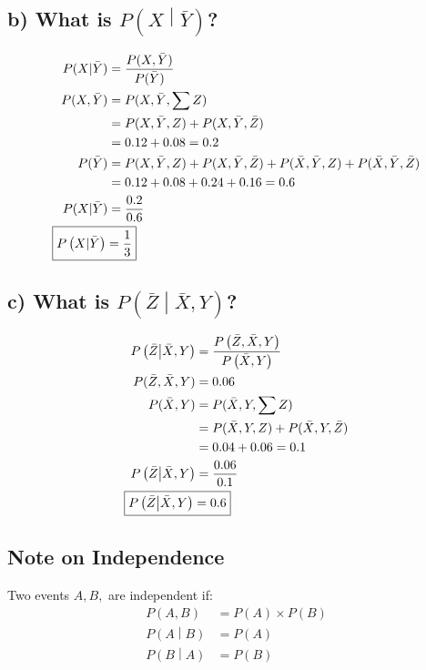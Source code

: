\documentclass[12pt,letterpaper]{article}
\begin{document}
\subsection{b) What is $P\left(X\middle|\bar{Y}\right)$?}
\begin{align*}
P(X|\bar{Y}) &= \frac{P(X,\bar{Y})}{P(\bar{Y})}\\
P(X,\bar{Y}) &= P(X,\bar{Y},\sum{Z})\\
&= P(X,\bar{Y},Z) + P(X,\bar{Y},\bar{Z})\\
&= 0.12 + 0.08 = 0.2\\
P(\bar{Y}) &= P(X,\bar{Y},Z) + P(X,\bar{Y},\bar{Z}) + P(\bar{X},\bar{Y},Z) + P(\bar{X},\bar{Y},\bar{Z})\\
&= 0.12 + 0.08 + 0.24 + 0.16 = 0.6\\
P(X|\bar{Y}) &= \frac{0.2}{0.6}\\
\Aboxed{P\left(X|\bar{Y}\right) &= \frac{1}{3}}
%
\end{align*}
\subsection{c) What is $P\left(\bar{Z}\middle|\bar{X},Y\right)$?}
\begin{align*}
P\left(\bar{Z}\middle|\bar{X},Y\right) &= \frac{P\left(\bar{Z},\bar{X},Y\right)}{P\left(\bar{X},Y\right)}\\
P(\bar{Z},\bar{X},Y) &= 0.06\\
P(\bar{X},Y) &= P(\bar{X},Y,\sum{Z})\\
&= P(\bar{X},Y,Z) + P(\bar{X},Y,\bar{Z})\\
&= 0.04 + 0.06 = 0.1\\
P\left(\bar{Z}\middle|\bar{X},Y\right) &= \frac{0.06}{0.1}\\
\Aboxed{P\left(\bar{Z}\middle|\bar{X},Y\right) &= 0.6}
%
\end{align*}
\subsection*{Note on Independence}
Two events $A,B,$ are independent if:
\begin{align}
P\left(A,B\right) &= P\left(A\right) \times P\left(B\right)\label{cond1}\\
P\left(A\middle|B\right) &= P\left(A\right)\label{cond2}\\
P\left(B\middle|A\right) &= P\left(B\right)\label{cond3}
\end{align}
\end{document}
